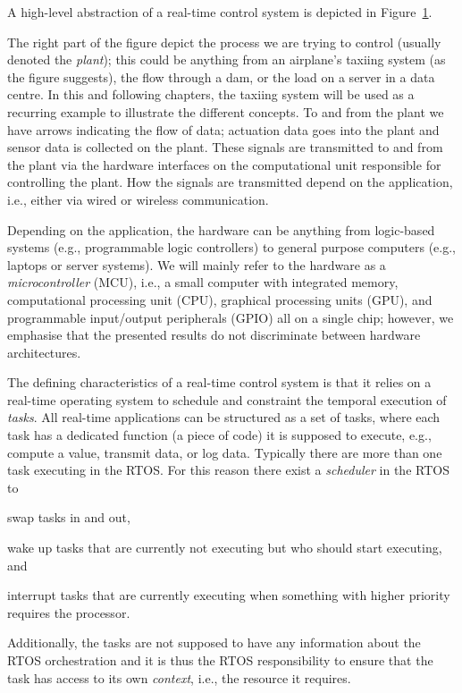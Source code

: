 A high-level abstraction of a real-time control system is depicted in Figure~\ref{fig:high-level-abstraction}.
%
\begin{figure}[t]
    \centering
    \caption{}%
    \label{fig:high-level-abstraction}%
\end{figure}
The right part of the figure depict the process we are trying to control (usually denoted the \emph{plant}); this could be anything from an airplane's taxiing system (as the figure suggests), the flow through a dam, or the load on a server in a data centre.
In this and following chapters, the taxiing system will be used as a recurring example to illustrate the different concepts.
To and from the plant we have arrows indicating the flow of data; actuation data goes into the plant and sensor data is collected on the plant.
These signals are transmitted to and from the plant via the hardware interfaces on the computational unit responsible for controlling the plant.
How the signals are transmitted depend on the application, i.e., either via wired or wireless communication.

Depending on the application, the hardware can be anything from logic-based systems (e.g., programmable logic controllers) to general purpose computers (e.g., laptops or server systems).
We will mainly refer to the hardware as a \emph{microcontroller} (MCU), i.e., a small computer with integrated memory, computational processing unit (CPU), graphical processing units (GPU), and programmable input/output peripherals (GPIO) all on a single chip; however, we emphasise that the presented results do not discriminate between hardware architectures.

The defining characteristics of a real-time control system is that it relies on a real-time operating system to schedule and constraint the temporal execution of \emph{tasks}.
All real-time applications can be structured as a set of tasks, where each task has a dedicated function (a piece of code) it is supposed to execute, e.g., compute a value, transmit data, or log data.
Typically there are more than one task executing in the RTOS.
For this reason there exist a \emph{scheduler} in the RTOS to
\begin{enumerate*}[label=(\roman*)]
    \item swap tasks in and out,
    \item wake up tasks that are currently not executing but who should start executing, and
    \item interrupt tasks that are currently executing when something with higher priority requires the processor.
\end{enumerate*}
Additionally, the tasks are not supposed to have any information about the RTOS orchestration and it is thus the RTOS responsibility to ensure that the task has access to its own \emph{context}, i.e., the resource it requires. 

